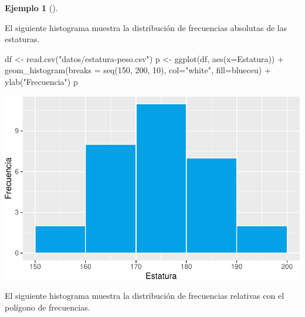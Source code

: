 \documentclass[
  a4paper,
]{scrreport}
\newenvironment{Shaded}{\begin{snugshade}}{\end{snugshade}}
\newcommand{\AttributeTok}[1]{\textcolor[rgb]{0.40,0.45,0.13}{#1}}
\newcommand{\DecValTok}[1]{\textcolor[rgb]{0.68,0.00,0.00}{#1}}
\newcommand{\FunctionTok}[1]{\textcolor[rgb]{0.28,0.35,0.67}{#1}}
\newcommand{\NormalTok}[1]{\textcolor[rgb]{0.00,0.23,0.31}{#1}}
\newcommand{\OtherTok}[1]{\textcolor[rgb]{0.00,0.23,0.31}{#1}}
\newcommand{\SpecialCharTok}[1]{\textcolor[rgb]{0.37,0.37,0.37}{#1}}
\newcommand{\StringTok}[1]{\textcolor[rgb]{0.13,0.47,0.30}{#1}}
\theoremstyle{plain}
\theoremstyle{definition}
\theoremstyle{definition}
\newtheorem{example}{Ejemplo}[chapter]
\theoremstyle{remark}
\begin{document}
\begin{example}[]\protect\hypertarget{exm-histograma}{}\label{exm-histograma}

El siguiente histograma muestra la distribución de frecuencias absolutas
de las estaturas.

\begin{Shaded}
\begin{Highlighting}[]
\NormalTok{df }\OtherTok{\textless{}{-}} \FunctionTok{read.csv}\NormalTok{(}\StringTok{"datos/estatura{-}peso.csv"}\NormalTok{)}
\NormalTok{p }\OtherTok{\textless{}{-}} \FunctionTok{ggplot}\NormalTok{(df, }\FunctionTok{aes}\NormalTok{(}\AttributeTok{x=}\NormalTok{Estatura)) }\SpecialCharTok{+} 
    \FunctionTok{geom\_histogram}\NormalTok{(}\AttributeTok{breaks =} \FunctionTok{seq}\NormalTok{(}\DecValTok{150}\NormalTok{, }\DecValTok{200}\NormalTok{, }\DecValTok{10}\NormalTok{), }\AttributeTok{col=}\StringTok{"white"}\NormalTok{, }\AttributeTok{fill=}\NormalTok{blueceu) }\SpecialCharTok{+}
    \FunctionTok{ylab}\NormalTok{(}\StringTok{"Frecuencia"}\NormalTok{)}
\NormalTok{p}
\end{Highlighting}
\end{Shaded}

\includegraphics{02-estadistica-descriptiva_files/figure-pdf/histograma-1.pdf}

El siguiente histograma muestra la distribución de frecuencias relativas
con el polígono de frecuencias.


\end{example}
\end{document}
